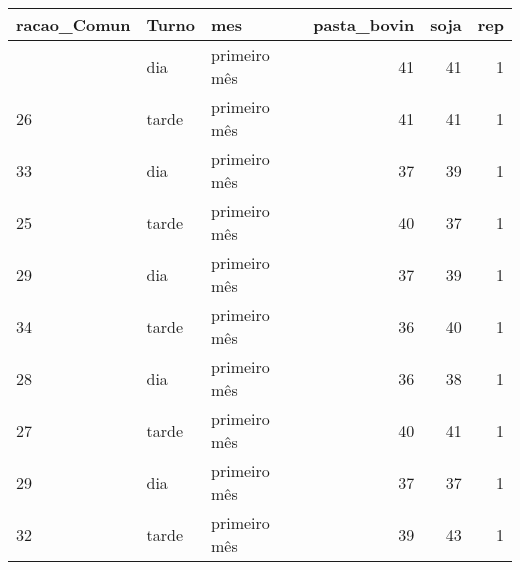 \documentclass[
  letterpaper,
  DIV=11,
  numbers=noendperiod]{scrartcl}
\begin{document}
\begin{longtable}[]{@{}lllrrr@{}}
\toprule\noalign{}
racao\_Comun & Turno & mes & pasta\_bovin & soja & rep \\
\midrule\noalign{}
\endhead
\bottomrule\noalign{}
\endlastfoot
26 & dia & primeiro mês & 41 & 41 & 1 \\
26 & tarde & primeiro mês & 41 & 41 & 1 \\
33 & dia & primeiro mês & 37 & 39 & 1 \\
25 & tarde & primeiro mês & 40 & 37 & 1 \\
29 & dia & primeiro mês & 37 & 39 & 1 \\
34 & tarde & primeiro mês & 36 & 40 & 1 \\
28 & dia & primeiro mês & 36 & 38 & 1 \\
27 & tarde & primeiro mês & 40 & 41 & 1 \\
29 & dia & primeiro mês & 37 & 37 & 1 \\
32 & tarde & primeiro mês & 39 & 43 & 1 \\
\end{longtable}
\end{document}
